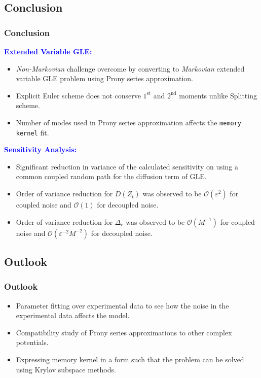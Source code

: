 \documentclass[a4paper,10pt]{beamer}
\newcommand{\rb}[1]{\left( #1 \right)}
\begin{document}
	\begin{frame}
		\section{Conclusion}
		\frametitle{Conclusion}
		\textcolor{blue}{\textbf{Extended Variable GLE:}}
		\begin{itemize}
			\item {\textit{Non-Markovian} challenge overcome by converting to \textit{Markovian} extended variable GLE problem using Prony series approximation.}
			\item {Explicit Euler scheme does not conserve $1^{\text{st}}$ and $2^{\text{nd}}$ moments unlike Splitting scheme.}
			\item {Number of modes used in Prony series approximation affects the \texttt{memory kernel} fit.}
		\end{itemize}
		\textcolor{blue}{\textbf{Sensitivity Analysis:}}
		\begin{itemize}
			\item {Significant reduction in variance of the calculated sensitivity on using a common coupled random path for the diffusion term of GLE.}
			\item {Order of variance reduction for $D\rb{Z_{t}}$ was observed to be $\mathcal{O}\rb{\varepsilon^{2}}$ for coupled noise and $\mathcal{O}\rb{1}$ for decoupled noise.}
			\item {Order of variance reduction for $\Delta_{c}$ was observed to be $\mathcal{O}\rb{M^{-1}}$ for coupled noise and $\mathcal{O}\rb{\varepsilon^{-2}M^{-2}}$ for decoupled noise.}
		\end{itemize}
	\end{frame}

	\begin{frame}
		\section{Outlook}
		\frametitle{Outlook}
		\large
		\begin{itemize}
			\item {Parameter fitting over experimental data to see how the noise in the experimental data affects the model.}
			\item {Compatibility study of Prony series approximations to other complex potentials.}
			\item {Expressing memory kernel in a form such that the problem can be solved using Krylov subspace methods.}
		\end{itemize}
	\end{frame}
		
\end{document}
